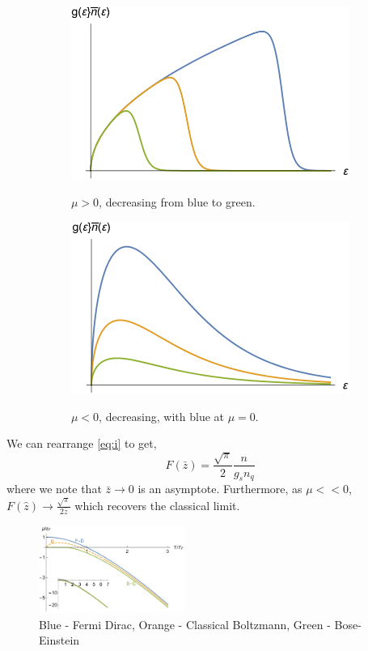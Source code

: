 \documentclass{book}
\begin{document}
\begin{figure}[h]
	\centering
	\begin{subfigure}{0.4\textwidth}
		\includegraphics[width=\textwidth]{a1.png}
		\label{fig:a1}
		\caption{$\mu > 0$, decreasing from blue to green.}
	\end{subfigure}
	\begin{subfigure}{0.4\textwidth}
		\includegraphics[width=\textwidth]{a2.png}
		\label{fig:a2}
		\caption{$\mu < 0$, decreasing, with blue at $\mu = 0$.}
	\end{subfigure}
	\caption{}
	\label{fig:a}
\end{figure}
\noindent
We can rearrange \eqref{eq:i} to get,
\begin{equation}
	F(\bar{z}) = \frac{\sqrt{\pi}}{2}\frac{n}{g_sn_q}
\end{equation}
where we note that $\bar{z} \to 0$ is an asymptote. Furthermore, as $\mu << 0$, $F(\hat{z}) \to \frac{\sqrt{\pi}}{2\bar{z}}$ which recovers the classical limit. 
\begin{figure}[h]
\centering
\includegraphics[width=0.425\textwidth]{muef}
\caption{Blue - Fermi Dirac, Orange - Classical Boltzmann, Green - Bose-Einstein}
\label{fig:muef}
\end{figure}
\end{document}
